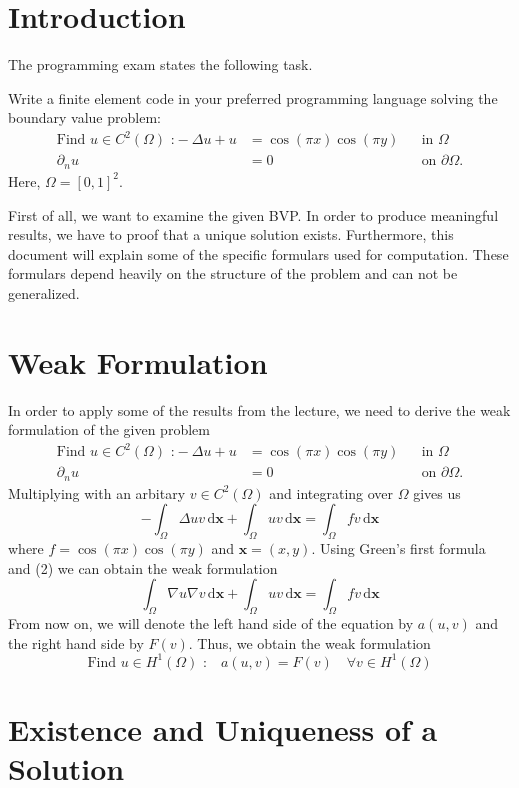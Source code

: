 \documentclass[a4paper,12pt]{article}
\begin{document}
\section{Introduction}
The programming exam states the following task.
\begin{framed}
Write a finite element code in your preferred programming language solving the boundary value problem:
\begin{align}
\mbox{Find } u\in C^2(\Omega)\mbox{ :}-\Delta u+u &= \cos(\pi x)\cos(\pi y) &&\mbox{in } \Omega \\
\partial _n u &= 0 &&\mbox{on } \partial\Omega.
\end{align}
Here, $\Omega = [0,1]^2$.
\end{framed}
First of all, we want to examine the given BVP. In order to produce meaningful results, we have to proof that a unique solution exists. Furthermore, this document will explain some of the specific formulars used for computation. These formulars depend heavily on the structure of the problem and can not be generalized.

\section{Weak Formulation}
In order to apply some of the results from the lecture, we need to derive the weak formulation of the given problem 
\begin{align}
\mbox{Find } u\in C^2(\Omega)\mbox{ :}-\Delta u+u &= \cos(\pi x)\cos(\pi y) &&\mbox{in } \Omega \\
\partial _n u &= 0 &&\mbox{on } \partial\Omega.
\end{align}
Multiplying with an arbitary $v\in C^2(\Omega)$ and integrating over $\Omega$ gives us
\[-\int _\Omega \Delta uv \,\mbox{d} \bm{x} + \int _\Omega uv \,\mbox{d} \bm{x} = \int _ \Omega fv\,\mbox{d} \bm{x}\]
where $f=\cos(\pi x)\cos(\pi y)$ and $\bm{x}=(x,y)$. Using Green's first formula and (2) we can obtain the weak formulation
\[\int _\Omega \nabla u\nabla v \,\mbox{d} \bm{x} + \int _\Omega uv \,\mbox{d} \bm{x} = \int _ \Omega fv\,\mbox{d} \bm{x}\]
From now on, we will denote the left hand side of the equation by $a(u,v)$ and the right hand side by $F(v)$. Thus, we obtain the weak formulation
\begin{equation}
\mbox{Find }u\in H^1(\Omega) \mbox{ :} \quad a(u,v)=F(v)\quad \forall v \in H^1(\Omega)
\end{equation}

\section{Existence and Uniqueness of a Solution}
\end{document}
